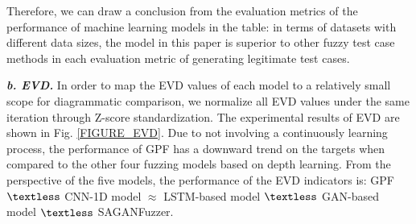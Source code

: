 Therefore, we can draw a conclusion from the evaluation metrics of the performance of machine learning models in the table: in terms of datasets with different data sizes, the model in this paper is superior to other fuzzy test case methods in each evaluation metric of generating legitimate test cases.


\quad \textit{\textbf{b. EVD.}}
In order to map the EVD values of each model to a relatively small scope for diagrammatic comparison, we normalize all EVD values under the same iteration through Z-score standardization. The experimental results of EVD are shown in Fig. \ref{FIGURE_EVD}. Due to not involving a continuously learning process, the performance of GPF has a downward trend on the targets when compared to the other four fuzzing models based on depth learning. From the perspective of the five models, the performance of the EVD indicators is: GPF $\textless$ CNN-1D model $\approx$ LSTM-based model $\textless$ GAN-based model $\textless$ SAGANFuzzer. 

